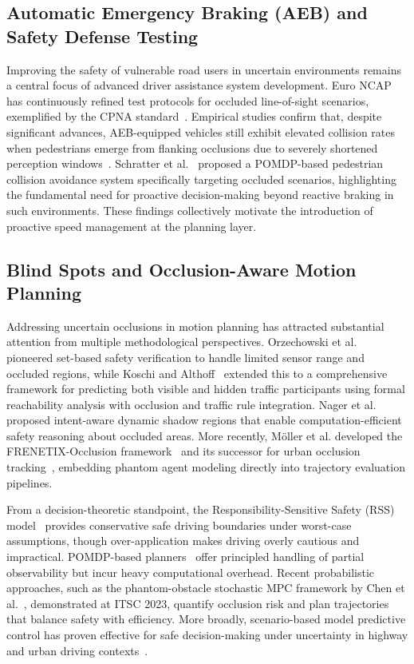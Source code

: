 \documentclass[letterpaper, 10 pt, conference]{ieeeconf}  %
\begin{document}
\subsection{Automatic Emergency Braking (AEB) and Safety Defense Testing}
Improving the safety of vulnerable road users in uncertain environments remains a central focus of advanced driver assistance system development. Euro NCAP has continuously refined test protocols for occluded line-of-sight scenarios, exemplified by the CPNA standard~\cite{euroncap2023}. Empirical studies confirm that, despite significant advances, AEB-equipped vehicles still exhibit elevated collision rates when pedestrians emerge from flanking occlusions due to severely shortened perception windows~\cite{cicchino2022effects}. Schratter et al.~\cite{schratter2019occlusion} proposed a POMDP-based pedestrian collision avoidance system specifically targeting occluded scenarios, highlighting the fundamental need for proactive decision-making beyond reactive braking in such environments. These findings collectively motivate the introduction of proactive speed management at the planning layer.

\subsection{Blind Spots and Occlusion-Aware Motion Planning}
Addressing uncertain occlusions in motion planning has attracted substantial attention from multiple methodological perspectives. Orzechowski et al.~\cite{orzechowski2018tackling} pioneered set-based safety verification to handle limited sensor range and occluded regions, while Koschi and Althoff~\cite{koschi2021setbased} extended this to a comprehensive framework for predicting both visible and hidden traffic participants using formal reachability analysis with occlusion and traffic rule integration. Nager et al.~\cite{nager2019shadows} proposed intent-aware dynamic shadow regions that enable computation-efficient safety reasoning about occluded areas. More recently, M\"{o}ller et al. developed the FRENETIX-Occlusion framework~\cite{blindspot2024} and its successor for urban occlusion tracking~\cite{occtrack2025}, embedding phantom agent modeling directly into trajectory evaluation pipelines.

From a decision-theoretic standpoint, the Responsibility-Sensitive Safety (RSS) model~\cite{shalev2017rss} provides conservative safe driving boundaries under worst-case assumptions, though over-application makes driving overly cautious and impractical. POMDP-based planners~\cite{zhang2021pomdp} offer principled handling of partial observability but incur heavy computational overhead. Recent probabilistic approaches, such as the phantom-obstacle stochastic MPC framework by Chen et al.~\cite{chen2023quantified}, demonstrated at ITSC 2023, quantify occlusion risk and plan trajectories that balance safety with efficiency. More broadly, scenario-based model predictive control has proven effective for safe decision-making under uncertainty in highway and urban driving contexts~\cite{cesari2017mpc}.
\end{document}
